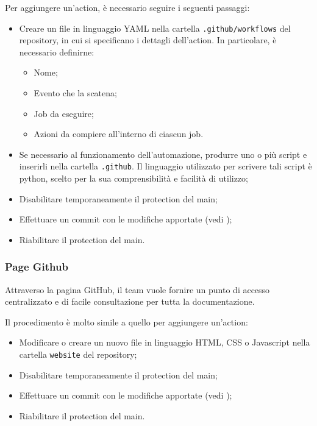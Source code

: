 Per aggiungere un'action, è necessario seguire i seguenti passaggi:
\begin{itemize}
      \item Creare un file in linguaggio YAML nella cartella \texttt{.github/workflows} del
            repository, in cui si specificano i dettagli dell'action. In particolare, è
            necessario definirne:
            \begin{itemize}
                  \item Nome;
                  \item Evento che la scatena;
                  \item Job da eseguire;
                  \item Azioni da compiere all'interno di ciascun job.
            \end{itemize}
      \item Se necessario al funzionamento dell'automazione, produrre uno o più script e
            inserirli nella cartella \texttt{.github}. Il linguaggio utilizzato per
            scrivere tali script è python, scelto per la sua comprensibilità e facilità di
            utilizzo;
      \item Disabilitare temporaneamente il protection del main;
      \item Effettuare un commit con le modifiche apportate (vedi );
      \item Riabilitare il protection del main.
\end{itemize}

\subsubsection{Page Github}
Attraverso la pagina GitHub, il team vuole fornire un punto di accesso centralizzato e di facile consultazione per tutta la documentazione.

Il procedimento è molto simile a quello per aggiungere un'action:
\begin{itemize}
      \item Modificare o creare un nuovo file in linguaggio HTML, CSS o Javascript nella cartella \texttt{website} del repository;
      \item Disabilitare temporaneamente il protection del main;
      \item Effettuare un commit con le modifiche apportate (vedi );
      \item Riabilitare il protection del main.
\end{itemize}



